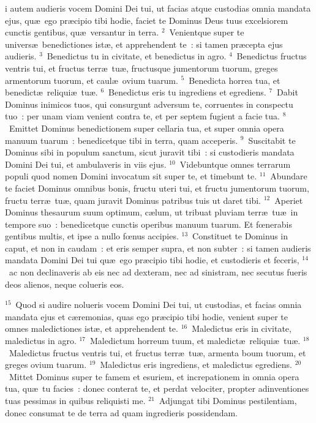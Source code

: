 \bchapter
{}i autem audieris vocem Domini Dei tui, ut facias atque custodias omnia mandata ejus, qu\ae\ ego pr\ae cipio tibi hodie, faciet te Dominus Deus tuus excelsiorem cunctis gentibus, qu\ae\ versantur in terra.
${}^{2}$~Venientque super te univers\ae\ benedictiones ist\ae , et apprehendent te~: si tamen pr\ae cepta ejus audieris.
${}^{3}$~Benedictus tu in civitate, et benedictus in agro.
${}^{4}$~Benedictus fructus ventris tui, et fructus terr\ae\ tu\ae , fructusque jumentorum tuorum, greges armentorum tuorum, et caul\ae\ ovium tuarum.
${}^{5}$~Benedicta horrea tua, et benedict\ae\ reliqui\ae\ tu\ae .
${}^{6}$~Benedictus eris tu ingrediens et egrediens.
${}^{7}$~Dabit Dominus inimicos tuos, qui consurgunt adversum te, corruentes in conspectu tuo~: per unam viam venient contra te, et per septem fugient a facie tua.
${}^{8}$~Emittet Dominus benedictionem super cellaria tua, et super omnia opera manuum tuarum~: benedicetque tibi in terra, quam acceperis.
${}^{9}$~Suscitabit te Dominus sibi in populum sanctum, sicut juravit tibi~: si custodieris mandata Domini Dei tui, et ambulaveris in viis ejus.
${}^{10}$~Videbuntque omnes terrarum populi quod nomen Domini invocatum sit super te, et timebunt te.
${}^{11}$~Abundare te faciet Dominus omnibus bonis, fructu uteri tui, et fructu jumentorum tuorum, fructu terr\ae\ tu\ae , quam juravit Dominus patribus tuis ut daret tibi.
${}^{12}$~Aperiet Dominus thesaurum suum optimum, c\ae lum, ut tribuat pluviam terr\ae\ tu\ae\ in tempore suo~: benedicetque cunctis operibus manuum tuarum. Et fœnerabis gentibus multis, et ipse a nullo fœnus accipies.
${}^{13}$~Constituet te Dominus in caput, et non in caudam~: et eris semper supra, et non subter~: si tamen audieris mandata Domini Dei tui qu\ae\ ego pr\ae cipio tibi hodie, et custodieris et feceris,
${}^{14}$~ac non declinaveris ab eis nec ad dexteram, nec ad sinistram, nec secutus fueris deos alienos, neque colueris eos.


${}^{15}$~Quod si audire nolueris vocem Domini Dei tui, ut custodias, et facias omnia mandata ejus et c\ae remonias, quas ego pr\ae cipio tibi hodie, venient super te omnes maledictiones ist\ae , et apprehendent te.
${}^{16}$~Maledictus eris in civitate, maledictus in agro.
${}^{17}$~Maledictum horreum tuum, et maledict\ae\ reliqui\ae\ tu\ae .
${}^{18}$~Maledictus fructus ventris tui, et fructus terr\ae\ tu\ae , armenta boum tuorum, et greges ovium tuarum.
${}^{19}$~Maledictus eris ingrediens, et maledictus egrediens.
${}^{20}$~Mittet Dominus super te famem et esuriem, et increpationem in omnia opera tua, qu\ae\ tu facies~: donec conterat te, et perdat velociter, propter adinventiones tuas pessimas in quibus reliquisti me.
${}^{21}$~Adjungat tibi Dominus pestilentiam, donec consumat te de terra ad quam ingredieris possidendam.


